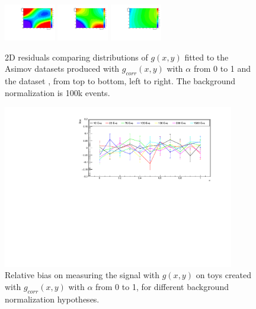 \begin{figure}[h]
\includegraphics[width=0.2\textwidth]{figures/sec-background/correlation/res_th2F_res_th2f_res_alpha_08_n100000.pdf}
\includegraphics[width=0.2\textwidth]{figures/sec-background/correlation/res_th2F_res_th2f_res_alpha_09_n100000.pdf}
\includegraphics[width=0.2\textwidth]{figures/sec-background/correlation/res_th2F_res_th2f_res_alpha_10_n100000.pdf}
  \caption{2D residuals comparing distributions of $g(x,y)$ fitted to the Asimov datasets produced with $g_{corr}(x,y)$ with $\alpha$ from 0 to 1 and the dataset , from top to bottom, left to right. The background normalization is 100k events.}
  \label{fig:res_norm100000}
\end{figure}

\begin{figure}[h]
  \centering
\includegraphics[width=0.9\textwidth]{figures/sec-background/CorrelationBias.pdf}
\caption{Relative bias on measuring the signal with $g(x,y)$ on toys created with $g_{corr}(x,y)$ with $\alpha$ from 0 to 1, for different background normalization hypotheses.}
\label{fig:corr_bias}
\end{figure}


